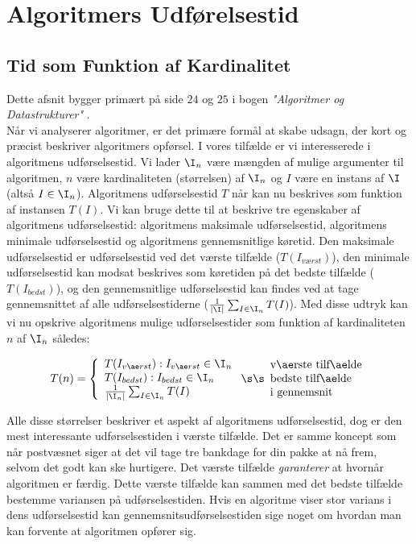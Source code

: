 \chapter{Algoritmers Udførelsestid}
\label{ch:Algoritmers Udførelsestid}

\section{Tid som Funktion af  Kardinalitet}
\label{sec:Tid som Funktion af Argumentets Kardinalitet}

Dette afsnit bygger primært på side $24$ og $25$ i bogen \emph{"Algoritmer og Datastrukturer"} \cite{aogd}.\\

Når vi analyserer algoritmer, er det primære formål at skabe udsagn, der kort og præcist beskriver algoritmers opførsel. I vores tilfælde er vi interesserede i algoritmens udførselsestid. Vi lader $\I _n$ være mængden af mulige argumenter til algoritmen, $n$ være kardinaliteten (størrelsen) af $\I _n$ og $I$ være en instans af $\I$ (altså $I \in \I _n$). Algoritmens udførselsestid $T$ når kan nu beskrives som funktion af instansen $T(I)$. Vi kan bruge dette til at beskrive tre egenskaber af algoritmens udførselsestid: algoritmens maksimale udførselsestid, algoritmens minimale udførselsestid og algoritmens gennemsnitlige køretid. Den maksimale udførselsestid er udførselsestid ved det værste tilfælde ($T(I_{værst})$), den minimale udførselsestid kan modsat beskrives som køretiden på det bedste tilfælde ($T(I_{bedst})$), og den gennemsnitlige udførselsestid kan findes ved at tage gennemsnittet af alle udførselsestiderne ($\frac{1}{|\I |} \sum_{I \in \I _n}T(I)$). Med disse udtryk kan vi nu opskrive algoritmens mulige udførselsestider som funktion af kardinaliteten $n$ af $\I _n$ således:

\[ T(n) = \left\{ \begin{array}{l}
	T(I_{værst}): I_{værst} \in \I _n  \\
	T(I_{bedst}): I_{bedst} \in \I _n  \\
	\frac{1}{|\I _n|} \sum_{I \in \I _n}T(I)
\end{array} \right.\s\s\begin{array}{l}
	\text{værste tilfælde}\\
	\text{bedste tilfælde}\\
	\text{i gennemsnit}
\end{array}\]

Alle disse størrelser beskriver et aspekt af algoritmens udførselsestid, dog er den mest interessante udførselsestiden i værste tilfælde. Det er samme koncept som når postvæsnet siger at det vil tage tre bankdage for din pakke at nå frem, selvom det godt kan ske hurtigere. Det værste tilfælde \emph{garanterer} at hvornår algoritmen er færdig. Dette værste tilfælde kan sammen med det bedste tilfælde bestemme variansen på udførselsestiden. Hvis en algoritme viser stor varians i dens udførselsestid kan gennemsnitsudførselsestiden sige noget om hvordan man kan forvente at algoritmen opfører sig.\\

